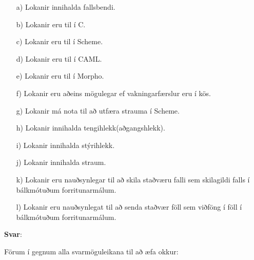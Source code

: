 \documentclass{article}
\begin{document}
\begin{itemize}
    \item[a)] Lokanir innihalda fallsbendi.
    \item[b)] Lokanir eru til í C.
    \item[c)] Lokanir eru til í Scheme.
    \item[d)] Lokanir eru til í CAML.
    \item[e)] Lokanir eru til í Morpho.
    \item[f)] Lokanir eru aðeins mögulegar ef vakningarfærslur eru í kös.
    \item[g)] Lokanir má nota til að utfæra strauma í Scheme.
    \item[h)] Lokanir innihalda tengihlekk(aðgangshlekk).
    \item[i)] Lokanir innihalda stýrihlekk.
    \item[j)] Lokanir innihalda straum.  
    \item[k)] Lokanir eru nauðsynlegar til að skila staðværu falli sem skilagildi falls í bálkmótuðum forritunarmálum.
    \item[l)] Lokanir eru nauðsynlegat til að senda staðvær föll sem viðföng í föll í bálkmótuðum forritunarmálum.        
\end{itemize}

\textbf{Svar}:



Förum í gegnum alla svarmöguleikana til að æfa okkur:
\end{document}
